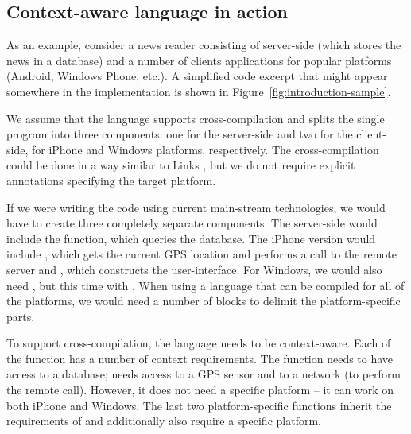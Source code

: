 
\subsection{Context-aware language in action}
\label{sec:intro-context-example}

As an example, consider a news reader consisting of server-side (which stores the news in a 
database) and a number of clients applications for popular platforms (Android, Windows Phone, etc.). 
A simplified code excerpt that might appear somewhere in the implementation is shown in
Figure~\ref{fig:introduction-sample}. 

We assume that the language supports cross-compilation and splits the single program into three
components: one for the server-side and two for the client-side, for iPhone and Windows platforms, 
respectively. The cross-compilation could be done in a way similar to Links \cite{app-distributed-links},
but we do not require explicit annotations specifying the target platform.

If we were writing the code using current main-stream technologies, we would have to create three 
completely separate components. The server-side would include the  function, which
queries the database. The iPhone version would include , which gets the current
GPS location and performs a call to the remote server and , which constructs the
user-interface. For Windows, we would also need , but this time with 
. When using a language that can be compiled for all of the platforms, we would need
a number of  blocks to delimit the platform-specific parts.

To support cross-compilation, the language needs to be context-aware. Each of the function has a 
number of context requirements. The  function needs to have access to a database;
 needs access to a GPS sensor and to a network (to perform the remote call).
However, it does not need a specific platform -- it can work on both iPhone and Windows. The last
two platform-specific functions inherit the requirements of  and additionally
also require a specific platform.



